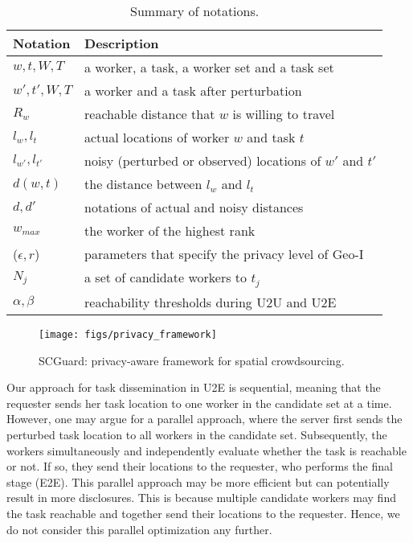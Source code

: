 \documentclass{USC-Thesis}
\newcommand{\tn}{\tabularnewline}
\newcommand{\SCG}{{SCGuard}}
\numberwithin{equation}{chapter}
\begin{document}
\begin{table}
\begin{center}
\footnotesize
\scriptsize{
\begin{tabular}{ l | l}
\hline
\textbf{Notation} & \textbf{Description} \tn
\hline
$w, t, W, T$ &  a worker, a task, a worker set and a task set \tn
\hline
$w', t', W, T$ &  a worker and a task after perturbation \tn
\hline
$R_w$ & reachable distance that $w$ is willing to travel \tn
\hline
$l_w, l_t$ & actual locations of worker $w$ and task $t$ \tn
\hline
$l_{w'}, l_{t'}$ & noisy (perturbed or observed) locations of $w'$ and $t'$ \tn
\hline
$d(w,t)$ & the distance between $l_w$ and $l_t$ \tn
\hline
$d, d'$ & notations of actual and noisy distances \tn
\hline
$w_{max}$ & the worker of the highest rank \tn
\hline
($\epsilon, r$) & parameters that specify the privacy level of Geo-I \tn
\hline
$N_j$ & a set of candidate workers to $t_j$ \tn
\hline
$\alpha, \beta$ & reachability thresholds during U2U and U2E\tn
\hline
\end{tabular}}
\caption{Summary of notations.}\label{tab:notation2}
\end{center}
\end{table}

\begin{figure}[ht]
		\centering
\texttt{[image: figs/privacy\_framework]}
	\caption{\SCG: privacy-aware framework for spatial crowdsourcing.}
	\label{fig:privacy_framework}
\end{figure}

Our approach for task dissemination in U2E is sequential, meaning that the requester sends her task location to one worker in the candidate set at a time. However, one may argue for a parallel approach, where the server first sends the perturbed task location to all workers in the candidate set. Subsequently, the workers simultaneously and independently evaluate whether the task is reachable or not. If so, they send their locations to the requester, who performs the final stage (E2E). This parallel approach may be more efficient but can potentially result in more disclosures. This is because multiple candidate workers may find the task reachable and together send their locations to the requester. Hence, we do not consider this parallel optimization any further.
\end{document}
